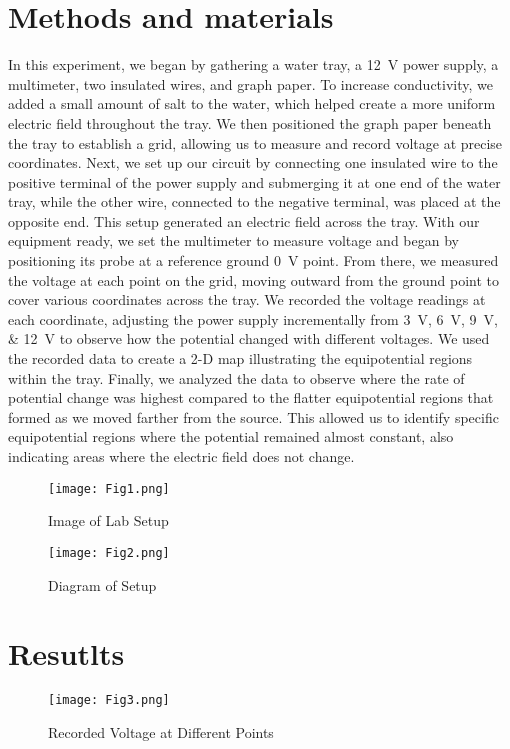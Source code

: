 \documentclass[10pt,journal,twoside]{IEEEtran}
\begin{document}
\section{Methods and materials}
In this experiment, we began by gathering a water tray, a \qty{12}{\volt} power supply, a multimeter, two insulated wires, and graph paper. To increase conductivity, we added a small amount of salt to the water, which helped create a more uniform electric field throughout the tray. We then positioned the graph paper beneath the tray to establish a grid, allowing us to measure and record voltage at precise coordinates. Next, we set up our circuit by connecting one insulated wire to the positive terminal of the power supply and submerging it at one end of the water tray, while the other wire, connected to the negative terminal, was placed at the opposite end. This setup generated an electric field across the tray. With our equipment ready, we set the multimeter to measure voltage and began by positioning its probe at a reference ground \qty{0}{\volt} point. From there, we measured the voltage at each point on the grid, moving outward from the ground point to cover various coordinates across the tray. We recorded the voltage readings at each coordinate, adjusting the power supply incrementally from \qtylist{3;6;9;12}{\volt} to observe how the potential changed with different voltages. We used the recorded data to create a 2-D map illustrating the equipotential regions within the tray. Finally, we analyzed the data to observe where the rate of potential change was highest compared to the flatter equipotential regions that formed as we moved farther from the source. This allowed us to identify specific equipotential regions where the potential remained almost constant, also indicating areas where the electric field does not change.

\begin{figure}
\centering
\begin{minipage}{0.50\columnwidth}
    \texttt{[image: Fig1.png]}
    \caption{Image of Lab Setup}
    \label{fig:setup}
\end{minipage}\hfill
\begin{minipage}{0.50\columnwidth}
    \texttt{[image: Fig2.png]}
    \caption{Diagram of Setup}
    \label{fig:diagram}
\end{minipage}
\end{figure}



\section{Resutlts}
\begin{figure}
    \centering
    \texttt{[image: Fig3.png]}
    \caption{Recorded Voltage at Different Points}
    \label{fig:voltage_data}
\end{figure}
\end{document}
